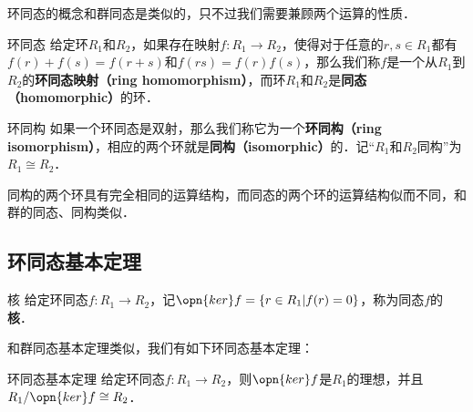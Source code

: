 

环同态的概念和群同态是类似的，只不过我们需要兼顾两个运算的性质．


\begin{definition}{环同态}
给定环$R_1$和$R_2$，如果存在映射$f:R_1\rightarrow R_2$，使得对于任意的$r, s\in R_1$都有$f(r)+f(s)=f(r+s)$和$f(rs)=f(r)f(s)$，那么我们称$f$是一个从$R_1$到$R_2$的\textbf{环同态映射（ring homomorphism）}，而环$R_1$和$R_2$是\textbf{同态（homomorphic）}的环．
\end{definition}

\begin{definition}{环同构}
如果一个环同态是双射，那么我们称它为一个\textbf{环同构（ring isomorphism）}，相应的两个环就是\textbf{同构（isomorphic）}的．记“$R_1$和$R_2$同构”为$R_1\cong R_2$．
\end{definition}

同构的两个环具有完全相同的运算结构，而同态的两个环的运算结构似而不同，和群的同态、同构类似．

\subsection{环同态基本定理}

\begin{definition}{核}
给定环同态$f:R_1\rightarrow R_2$，记$\opn{ker}f=\{r\in R_1|f(r)=0\}$，称为同态$f$的\textbf{核}．
\end{definition}


和群同态基本定理类似，我们有如下环同态基本定理：

\begin{definition}{环同态基本定理}
给定环同态$f:R_1\rightarrow R_2$，则$\opn{ker}f$是$R_1$的理想，并且$R_1/\opn{ker}f\cong R_2$．
\end{definition}






